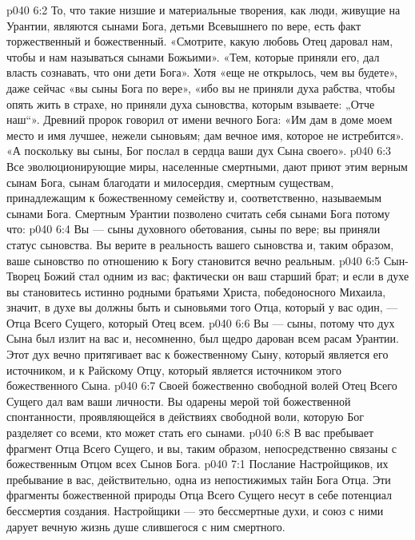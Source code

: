 \vs p040 6:2 То, что такие низшие и материальные творения, как люди, живущие на Урантии, являются сынами Бога, детьми Всевышнего по вере, есть факт торжественный и божественный. «Смотрите, какую любовь Отец даровал нам, чтобы и нам называться сынами Божьими». «Тем, которые приняли его, дал власть сознавать, что они дети Бога». Хотя «еще не открылось, чем вы будете», даже сейчас «вы сыны Бога по вере», «ибо вы не приняли духа рабства, чтобы опять жить в страхе, но приняли духа сыновства, которым взываете: „Отче наш“». Древний пророк говорил от имени вечного Бога: «Им дам в доме моем место и имя лучшее, нежели сыновьям; дам вечное имя, которое не истребится». «А поскольку вы сыны, Бог послал в сердца ваши дух Сына своего».
\vs p040 6:3 Все эволюционирующие миры, населенные смертными, дают приют этим верным сынам Бога, сынам благодати и милосердия, смертным существам, принадлежащим к божественному семейству и, соответственно, называемым сынами Бога. Смертным Урантии позволено считать себя сынами Бога потому что:
\vs p040 6:4 \bibnobreakspace Вы --- сыны духовного обетования, сыны по вере; вы приняли статус сыновства. Вы верите в реальность вашего сыновства и, таким образом, ваше сыновство по отношению к Богу становится вечно реальным.
\vs p040 6:5 \pc {}\bibnobreakspace Сын\hyp{}Творец Божий стал одним из вас; фактически он ваш старший брат; и если в духе вы становитесь истинно родными братьями Христа, победоносного Михаила, значит, в духе вы должны быть и сыновьями того Отца, который у вас один, --- Отца Всего Сущего, который Отец всем.
\vs p040 6:6 \pc {}\bibnobreakspace Вы --- сыны, потому что дух Сына был излит на вас и, несомненно, был щедро дарован всем расам Урантии. Этот дух вечно притягивает вас к божественному Сыну, который является его источником, и к Райскому Отцу, который является источником этого божественного Сына.
\vs p040 6:7 \pc {}\bibnobreakspace Своей божественно свободной волей Отец Всего Сущего дал вам ваши личности. Вы одарены мерой той божественной спонтанности, проявляющейся в действиях свободной воли, которую Бог разделяет со всеми, кто может стать его сынами.
\vs p040 6:8 \pc {}\bibnobreakspace В вас пребывает фрагмент Отца Всего Сущего, и вы, таким образом, непосредственно связаны с божественным Отцом всех Сынов Бога.
\vs p040 7:1 Послание Настройщиков, их пребывание в вас, действительно, одна из непостижимых тайн Бога Отца. Эти фрагменты божественной природы Отца Всего Сущего несут в себе потенциал бессмертия создания. Настройщики --- это бессмертные духи, и союз с ними дарует вечную жизнь душе слившегося с ним смертного.
